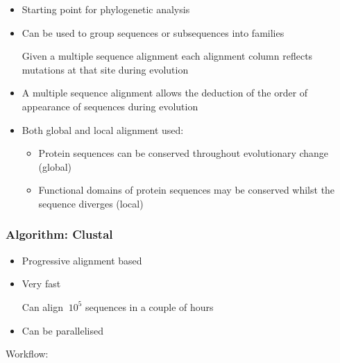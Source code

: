 \documentclass[a4paper]{article}
\begin{document}
\begin{itemize}
  \item
    Starting point for phylogenetic analysis

  \item
    Can be used to group sequences or subsequences into families

    Given a multiple sequence alignment each alignment column reflects mutations
    at that site during evolution

  \item
    A multiple sequence alignment allows the deduction of the order of
    appearance of sequences during evolution

  \item
    Both global and local alignment used:

    \begin{itemize}
      \item
        Protein sequences can be conserved throughout evolutionary change
        (global)

      \item
        Functional domains of protein sequences may be conserved whilst the
        sequence diverges (local)
    \end{itemize}
\end{itemize}

\subsubsection{Algorithm: Clustal}

\begin{itemize}
  \item
    Progressive alignment based

  \item
    Very fast

    Can align $~10^{5}$ sequences in a couple of hours

  \item
    Can be parallelised
\end{itemize}

Workflow:
\end{document}
